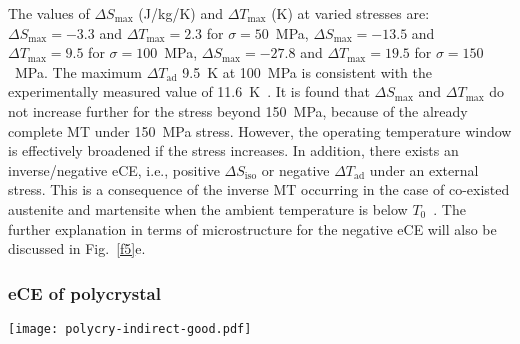 \documentclass[reprint,3p,sort&compress,times,onecolumn]{elsarticle}
\begin{document}
The values of $\Delta S_{\text{max}}$ (J/kg/K) and $\Delta T_{\text{max}}$ (K) at varied stresses are: $\Delta S_{\text{max}}=-3.3$ and $\Delta T_{\text{max}}=2.3$ for $\sigma=50$~MPa, $\Delta S_{\text{max}}=-13.5$ and $\Delta T_{\text{max}}=9.5$ for $\sigma=100$~MPa, $\Delta S_{\text{max}}=-27.8$ and $\Delta T_{\text{max}}=19.5$ for $\sigma=150$~MPa. The maximum $\Delta T_{\text{ad}}$ 9.5~K at 100~MPa is consistent with the experimentally measured value of  11.6~K~\cite{qian2016elastocaloric}. It is found that $\Delta S_{\text{max}}$ and $\Delta T_{\text{max}}$ do not increase further for the stress beyond 150~MPa, because of the already complete MT under 150~MPa stress. However, the operating temperature window is effectively broadened if the stress increases. In addition, there exists an inverse/negative eCE, i.e., positive $\Delta S_{\text{iso}}$ or negative $\Delta T_{\text{ad}}$ under an external stress. This is a consequence of the inverse MT occurring in the case of co-existed austenite and martensite when the ambient temperature is below $T_0$~\cite{bonnot2008elastocaloric,alvarez2017conventional,Xiao2021}. The further explanation in terms of microstructure for the negative eCE will also be discussed in Fig.~\ref{f5}e.



\subsubsection{eCE of polycrystal}

\begin{figure*}[!t]
\centering
  \texttt{[image: polycry-indirect-good.pdf]}
  \caption{(a) Stress-strain responses of polycrystal under 500~MPa compressive stress at various temperatures. (b) Strain-temperature curves,  (c) $\Delta S_{\text{iso}}$, and (d) $\Delta T_{\text{ad}}$ under various compressive stresses. Phase evolution under 150~MPa at (e) 241~K ( in (c)) and (f) 248~K ( in (c)). V1, V2, and A are coloured in yellow, red and blue, respectively.} \label{f5}
\end{figure*}
\end{document}
